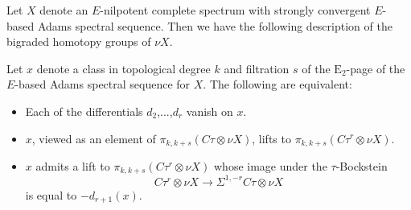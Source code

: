 \begin{thm} \label{thm:synthetic-Adams}
  Let $X$ denote an $E$-nilpotent complete spectrum with strongly convergent $E$-based Adams spectral sequence.
  Then we have the following description of the bigraded homotopy groups of $\nu X$.

  Let $x$ denote a class in topological degree $k$ and filtration $s$ of the $\mathrm{E}_2$-page of the $E$-based Adams spectral sequence for $X$. The following are equivalent:
  \begin{itemize}
  \item[(1a)] Each of the differentials $d_2$,...,$d_r$ vanish on $x$.
  \item[(1b)] $x$, viewed as an element of $\pi_{k,k+s}(C\tau \otimes \nu X)$, lifts to $\pi_{k,k+s}(C\tau^r \otimes \nu X)$.
  \item[(1c)] $x$ admits a lift to $\pi_{k,k+s}(C\tau^r \otimes \nu X)$ whose image under the $\tau$-Bockstein
  $$ C\tau^r \otimes \nu X \to \Sigma^{1,-r} C\tau \otimes \nu X $$
  is equal to $-d_{r+1}(x)$.
  \end{itemize}


\end{thm}

